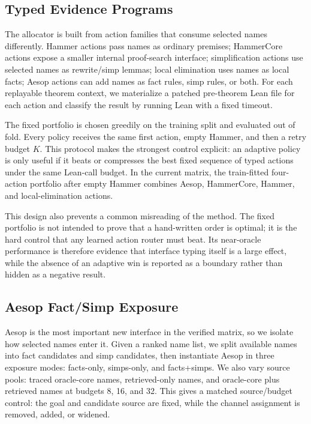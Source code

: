 \documentclass{article}
\begin{document}
\subsection{Typed Evidence Programs}

The allocator is built from action families that consume selected names differently. Hammer actions pass names as ordinary premises; HammerCore actions expose a smaller internal proof-search interface; simplification actions use selected names as rewrite/simp lemmas; local elimination uses names as local facts; Aesop actions can add names as fact rules, simp rules, or both. For each replayable theorem context, we materialize a patched pre-theorem Lean file for each action and classify the result by running Lean with a fixed timeout.

The fixed portfolio is chosen greedily on the training split and evaluated out of fold. Every policy receives the same first action, empty Hammer, and then a retry budget $K$. This protocol makes the strongest control explicit: an adaptive policy is only useful if it beats or compresses the best fixed sequence of typed actions under the same Lean-call budget. In the current matrix, the train-fitted four-action portfolio after empty Hammer combines Aesop, HammerCore, Hammer, and local-elimination actions.

This design also prevents a common misreading of the method. The fixed portfolio is not intended to prove that a hand-written order is optimal; it is the hard control that any learned action router must beat. Its near-oracle performance is therefore evidence that interface typing itself is a large effect, while the absence of an adaptive win is reported as a boundary rather than hidden as a negative result.

\subsection{Aesop Fact/Simp Exposure}

Aesop is the most important new interface in the verified matrix, so we isolate how selected names enter it. Given a ranked name list, we split available names into fact candidates and simp candidates, then instantiate Aesop in three exposure modes: facts-only, simps-only, and facts+simps. We also vary source pools: traced oracle-core names, retrieved-only names, and oracle-core plus retrieved names at budgets 8, 16, and 32. This gives a matched source/budget control: the goal and candidate source are fixed, while the channel assignment is removed, added, or widened.
\end{document}
